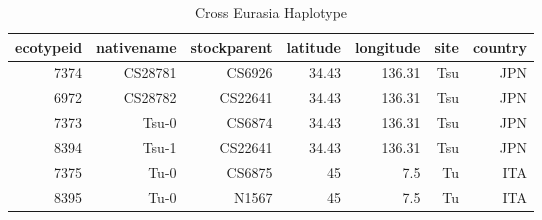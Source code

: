 \documentclass[a4paper,10pt]{article}
\begin{document}
\begin{table}
\caption{Cross Eurasia Haplotype}
\begin{tabular}{|r|r|r|r|r|r|r|}
\hline
ecotypeid & nativename & stockparent & latitude & longitude & site & country\\
\hline
7374 & CS28781    & CS6926      &    34.43 &    136.31 & Tsu  & JPN  \\
6972 & CS28782    & CS22641     &    34.43 &    136.31 & Tsu  & JPN  \\
7373 & Tsu-0      & CS6874      &    34.43 &    136.31 & Tsu  & JPN  \\
8394 & Tsu-1      & CS22641     &    34.43 &    136.31 & Tsu  & JPN  \\
7375 & Tu-0       & CS6875      &       45 &       7.5 & Tu   & ITA  \\
8395 & Tu-0       & N1567       &       45 &       7.5 & Tu   & ITA  \\
\hline
\end{tabular}
\label{thap_1}
\end{table}
\end{document}
